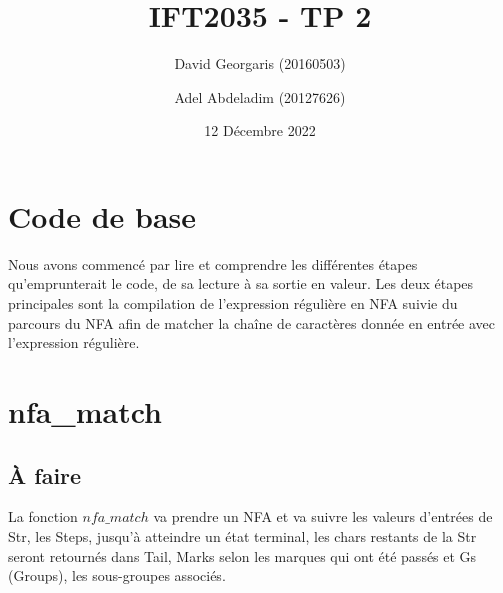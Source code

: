 \documentclass{article}
\title{IFT2035 - TP 2}
\author{David Georgaris (20160503) \and Adel Abdeladim (20127626) }
\date{12 Décembre 2022}
\begin{document}
\maketitle
\section{Code de base}
    Nous avons commencé par lire et comprendre les différentes étapes 
    qu'emprunterait le code, de sa lecture à sa sortie en valeur. Les 
    deux étapes principales sont la compilation de l'expression régulière
    en NFA suivie du parcours du NFA afin de matcher la chaîne de caractères 
    donnée en entrée avec l'expression régulière. \\


\section{nfa\_match}
    \subsection{À faire}
        La fonction $nfa\_match$ va prendre un NFA et va suivre les valeurs d'entrées de Str, les Steps, jusqu'à atteindre un état terminal, les chars restants de la Str seront retournés dans Tail, Marks selon les marques qui ont été passés et Gs (Groups), les sous-groupes associés.  
\end{document}
